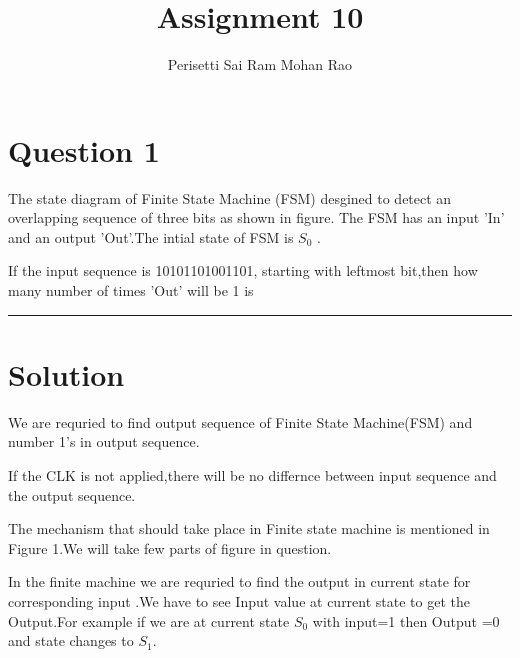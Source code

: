 \documentclass{article}
\title{Assignment 10}
\author{Perisetti Sai Ram Mohan Rao}
\begin{document}
\maketitle

\section{Question 1}
The state diagram of Finite State Machine (FSM) desgined to detect an overlapping sequence of three bits as shown in figure. The FSM has an input 'In' and an output 'Out'.The intial state of FSM is $S_0$ .

\begin{figure}[h]
\centering

\caption{}
\label{figure}
\end{figure}

If the input sequence is 10101101001101, starting with leftmost bit,then how many number of times 'Out' will be 1 is \rule{2cm}{0.10mm}

\maketitle 

\section{Solution}
We are requried to find output sequence of Finite State Machine(FSM) and number 1's in output sequence.

\begin{figure}[h]
\centering

\caption{}
\label{figure}
\end{figure}

If the CLK is not applied,there will be no differnce between input sequence and the output sequence.

The mechanism that should take place in Finite state machine is mentioned in Figure 1.We will take few parts of figure in question.


\begin{figure}[!ht]
\centering

\caption{}
\label{figure}
\end{figure}

\begin{figure}[h]
\centering

\caption{}
\label{figure}
\end{figure}




In the finite machine we are requried to find the output in current state for corresponding input .We have to see Input value at current state to get the Output.For example if we are at current state $S_0$ with input=1 then Output =0 and state changes to $S_1$.
\end{document}
